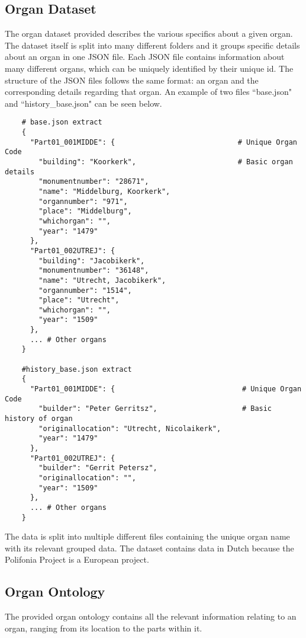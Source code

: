 \subsection{Organ Dataset}
\hspace{0.5cm} The organ dataset provided describes the various specifics about a given organ. The dataset itself is split into many different folders and it groups specific details about an organ in one JSON file. Each JSON file contains information about many different organs, which can be uniquely identified by their unique id. The structure of the JSON files follows the same format: an organ and the corresponding details regarding that organ. An example of two files ``base.json" and ``history\_base.json" can be seen below. 

\begin{lstlisting}
    # base.json extract
    {
      "Part01_001MIDDE": {                             # Unique Organ Code
        "building": "Koorkerk",                        # Basic organ details
        "monumentnumber": "28671",
        "name": "Middelburg, Koorkerk",
        "organnumber": "971",
        "place": "Middelburg",
        "whichorgan": "",
        "year": "1479"
      },
      "Part01_002UTREJ": {
        "building": "Jacobikerk",
        "monumentnumber": "36148",
        "name": "Utrecht, Jacobikerk",
        "organnumber": "1514",
        "place": "Utrecht",
        "whichorgan": "",
        "year": "1509"
      },
      ... # Other organs
    }

    #history_base.json extract
    {
      "Part01_001MIDDE": {                              # Unique Organ Code
        "builder": "Peter Gerritsz",                    # Basic history of organ
        "originallocation": "Utrecht, Nicolaikerk",
        "year": "1479"
      },
      "Part01_002UTREJ": {
        "builder": "Gerrit Petersz",
        "originallocation": "",
        "year": "1509"
      },
      ... # Other organs
    }
\end{lstlisting}

The data is split into multiple different files containing the unique organ name with its relevant grouped data. The dataset contains data in Dutch because the Polifonia Project is a European project.

\subsection{Organ Ontology}
\hspace{0.5cm} The provided organ ontology contains all the relevant information relating to an organ, ranging from its location to the parts within it. 


